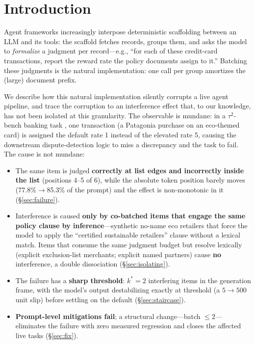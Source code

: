 \section{Introduction}

Agent frameworks increasingly interpose deterministic scaffolding between an LLM and its tools: the scaffold
fetches records, groups them, and asks the model to \emph{formalize} a judgment per record---e.g., ``for each
of these credit-card transactions, report the reward rate the policy documents assign to it.'' Batching these
judgments is the natural implementation: one call per group amortizes the (large) document prefix.

We describe how this natural implementation silently corrupts a live agent pipeline, and trace the corruption
to an interference effect that, to our knowledge, has not been isolated at this granularity. The observable is
mundane: in a $\tau^2$-bench banking task \citep{tau2bench}, one transaction (a Patagonia purchase on an
eco-themed card) is assigned the default rate 1 instead of the elevated rate 5, causing the downstream
dispute-detection logic to miss a discrepancy and the task to fail. The cause is not mundane:

\begin{itemize}
\item The same item is judged \textbf{correctly at list edges and incorrectly inside the list} (positions 4--5
  of 6), while the absolute token position barely moves (77.8\%$\rightarrow$85.3\% of the prompt) and the
  effect is non-monotonic in it (\S\ref{sec:failure}).
\item Interference is caused \textbf{only by co-batched items that engage the same policy clause by
  inference}---synthetic no-name eco retailers that force the model to apply the ``certified sustainable
  retailers'' clause without a lexical match. Items that consume the same judgment budget but resolve lexically
  (explicit exclusion-list merchants; explicit named partners) cause \textbf{no} interference, a double
  dissociation (\S\ref{sec:isolating}).
\item The failure has a \textbf{sharp threshold}: $k^\ast{=}2$ interfering items in the generation frame, with
  the model's output destabilizing exactly at threshold (a $5\rightarrow500$ unit slip) before settling on the
  default (\S\ref{sec:staircase}).
\item \textbf{Prompt-level mitigations fail}; a structural change---batch $\le 2$---eliminates the failure
  with zero measured regression and closes the affected live tasks (\S\ref{sec:fix}).
\end{itemize}

